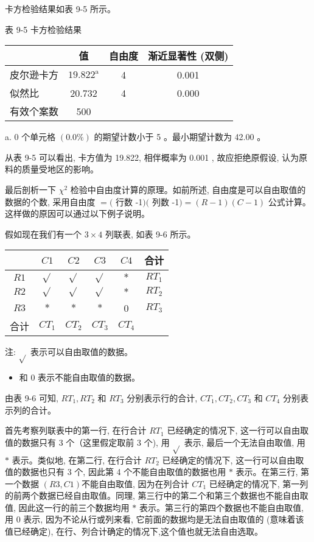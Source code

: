 \documentclass[10pt]{article}
\begin{document}
\begin{CJK*}{UTF8}{bsmi}
卡方检验结果如表 9-5 所示。

表 9-5 卡方检验结果

\begin{center}
\begin{tabular}{lccc}
\hline
 & 值 & 自由度 & 渐近显著性 (双侧) \\
\hline
皮尔逊卡方 & $19.822^{\mathrm{a}}$ & 4 & 0.001 \\
似然比 & 20.732 & 4 & 0.000 \\
有效个案数 & 500 &  &  \\
\hline
\end{tabular}
\end{center}

a. 0 个单元格 $(0.0 \%)$ 的期望计数小于 5 。最小期望计数为 42.00 。

从表 9-5 可以看出, 卡方值为 19.822, 相伴概率为 0.001 , 故应拒绝原假设, 认为原料的质量受地区的影响。

最后剖析一下 $\chi^{2}$ 检验中自由度计算的原理。如前所述, 自由度是可以自由取值的数据的个数, 采用自由度 $=($ 行数 -1$)($ 列数 -1$)=(R-1)(C-1)$ 公式计算。这样做的原因可以通过以下例子说明。

假如现在我们有一个 $3 \times 4$ 列联表, 如表 9-6 所示。

\begin{center}
\begin{tabular}{cccccc}
\hline
 & $C 1$ & $C 2$ & $C 3$ & $C 4$ & 合计 \\
\hline
$R 1$ & $\sqrt{ }$ & $\sqrt{ }$ & $\sqrt{ }$ & $*$ & $R T_{1}$ \\
$R 2$ & $\sqrt{ }$ & $\sqrt{ }$ & $\sqrt{ }$ & $*$ & $R T_{2}$ \\
$R 3$ & $*$ & $*$ & $*$ & 0 & $R T_{3}$ \\
合计 & $C T_{1}$ & $C T_{2}$ & $C T_{3}$ & $C T_{4}$ &  \\
\hline
\end{tabular}
\end{center}

注: $\sqrt{ }$ 表示可以自由取值的数据。

\begin{itemize}
  \item 和 0 表示不能自由取值的数据。
\end{itemize}

由表 9-6 可知, $R T_{1}, R T_{2}$ 和 $R T_{3}$ 分别表示行的合计, $C T_{1}, C T_{2}, C T_{3}$ 和 $C T_{4}$ 分别表示列的合计。

首先考察列联表中的第一行, 在行合计 $R T_{1}$ 已经确定的情况下, 这一行可以自由取值的数据只有 3 个（这里假定取前 3 个), 用 $\sqrt{ }$ 表示, 最后一个无法自由取值, 用 $*$ 表示。类似地, 在第二行, 在行合计 $R T_{2}$ 已经确定的情况下, 这一行可以自由取值的数据也只有 3 个, 因此第 4 个不能自由取值的数据也用 $*$ 表示。在第三行, 第一个数据 $(R 3, C 1)$不能自由取值, 因为在列合计 $C T_{1}$ 已经确定的情况下, 第一列的前两个数据已经自由取值。同理, 第三行中的第二个和第三个数据也不能自由取值, 因此这一行的前三个数据均用 $*$ 表示。第三行的第四个数据也不能自由取值, 用 0 表示, 因为不论从行或列来看, 它前面的数据均是无法自由取值的 (意味着该值已经确定), 在行、列合计确定的情况下,这个值也就无法自由选取。


\end{CJK*}
\end{document}
